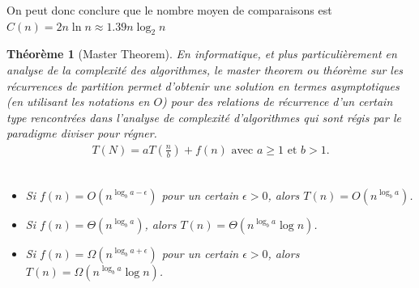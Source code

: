 \documentclass{article}
\newtheorem*{theorem}{Théor\`{e}me}
\begin{document}
            On peut donc conclure que le nombre moyen de comparaisons est $C(n) = 2n \ln{n} \approx 1.39n \log_{2}{n}$
            
            \begin{theorem}[Master Theorem]
                En informatique, et plus particulièrement en analyse de la complexité des algorithmes, le master theorem ou théorème sur les récurrences de partition permet d'obtenir une solution en termes asymptotiques (en utilisant les notations en $O$) pour des relations de récurrence d'un certain type rencontrées dans l'analyse de complexité d'algorithmes qui sont régis par le paradigme diviser pour régner.
                    \begin{gather*}
                        T(N)=aT(\frac{n}{b})+f(n) \text{ avec $a \geq 1$ et $b > 1$}.
                    \end{gather*}
                \\
                \begin{itemize}
                    \item Si $f(n)=O(n^{\log_{b}{a}-\epsilon})$ pour un certain $\epsilon > 0$, alors $T(n)=O(n^{\log_{b}{a}})$.
                    \item Si $f(n)=\Theta(n^{\log_{b}{a}})$, alors $T(n)=\Theta(n^{\log_{b}{a}}\log{n})$.
                    \item Si $f(n)=\Omega(n^{\log_{b}{a}+\epsilon})$ pour un certain $\epsilon > 0$, alors $T(n)=\Omega(n^{\log_{b}{a}}\log{n})$.
                \end{itemize}
            \end{theorem}
\end{document}

